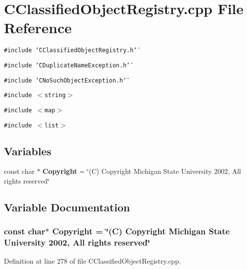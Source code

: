 \section{CClassified\-Object\-Registry.cpp File Reference}
\label{CClassifiedObjectRegistry_8cpp}
{\tt \#include \char`\"{}CClassified\-Object\-Registry.h\char`\"{}}\par
{\tt \#include \char`\"{}CDuplicate\-Name\-Exception.h\char`\"{}}\par
{\tt \#include \char`\"{}CNo\-Such\-Object\-Exception.h\char`\"{}}\par
{\tt \#include $<$string$>$}\par
{\tt \#include $<$map$>$}\par
{\tt \#include $<$list$>$}\par
\subsection*{Variables}
\begin{CompactItemize}
\item 
const char $\ast$ {\bf Copyright} = \char`\"{}(C) Copyright Michigan State University 2002, All rights reserved\char`\"{}
\end{CompactItemize}


\subsection{Variable Documentation}
\subsubsection{\setlength{\rightskip}{0pt plus 5cm}const char$\ast$ Copyright = \char`\"{}(C) Copyright Michigan State University 2002, All rights reserved\char`\"{}\hspace{0.3cm}{\tt  [static]}}\label{CClassifiedObjectRegistry_8cpp_a0}




Definition at line 278 of file CClassified\-Object\-Registry.cpp.